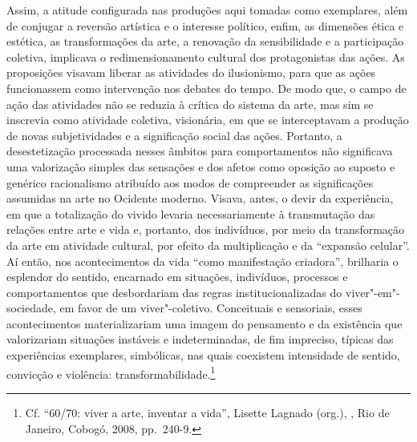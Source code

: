 Assim, a atitude configurada nas produções aqui tomadas como exemplares,
além de conjugar a reversão artística e o interesse político, enfim, as
dimensões ética e estética, as transformações da arte, a renovação da
sensibilidade e a participação coletiva, implicava o redimensionamento
cultural dos protagonistas das ações. As proposições visavam liberar as
atividades do ilusionismo, para que as ações funcionassem como
intervenção nos debates do tempo. De modo que, o campo de ação das
atividades não se reduzia à crítica do sistema da arte, mas sim se
inscrevia como atividade coletiva, visionária, em que se interceptavam a
produção de novas subjetividades e a significação social das ações.
Portanto, a desestetização processada nesses âmbitos para comportamentos
não significava uma valorização simples das sensações e dos afetos como
oposição ao suposto e genérico racionalismo atribuído aos modos de
compreender as significações assumidas na arte no Ocidente moderno.
Visava, antes, o devir da experiência, em que a totalização do vivido
levaria necessariamente à transmutação das relações entre arte e vida e,
portanto, dos indivíduos, por meio da transformação da arte em atividade
cultural, por efeito da multiplicação e da ``expansão celular''. Aí
então, nos acontecimentos da vida ``como manifestação criadora'',
brilharia o esplendor do sentido, encarnado em situações, indivíduos,
processos e comportamentos que desbordariam das regras
institucionalizadas do viver"-em"-sociedade, em favor de um
viver"-coletivo. Conceituais e sensoriais, esses acontecimentos
materializariam uma imagem do pensamento e da existência que
valorizariam situações instáveis e indeterminadas, de fim impreciso,
típicas das experiências exemplares, simbólicas, nas quais coexistem
intensidade de sentido, convicção e violência:
transformabilidade.\footnote{Cf. ``60/70: viver a arte, inventar a
vida'', Lisette Lagnado (org.), {}, Rio de Janeiro, Cobogó, 2008, pp.~240-9.}

\pagebreak

\setcounter{footnote}{0}
\begin{vplace}[0.25]
\thispagestyle{empty}
{\large{}}
\end{vplace}

\pagebreak
\thispagestyle{empty}

